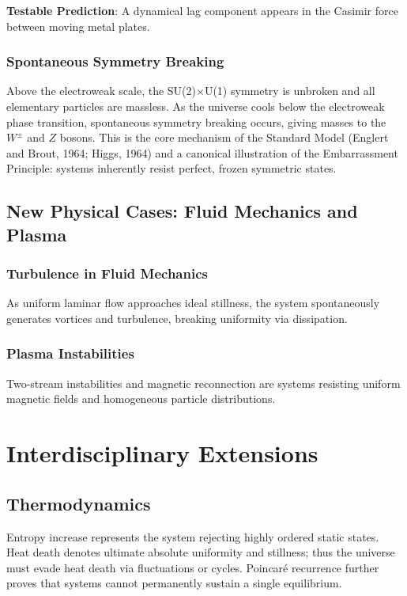 \documentclass[10pt,a4paper]{article}
\begin{document}
\textbf{Testable Prediction}: A dynamical lag component appears in the Casimir force between moving metal plates.

\subsubsection{Spontaneous Symmetry Breaking}
Above the electroweak scale, the SU(2)$\times$U(1) symmetry is unbroken and all elementary particles are massless. As the universe cools below the electroweak phase transition, spontaneous symmetry breaking occurs, giving masses to the $W^\pm$ and $Z$ bosons. This is the core mechanism of the Standard Model (Englert and Brout, 1964; Higgs, 1964) and a canonical illustration of the Embarrassment Principle: systems inherently resist perfect, frozen symmetric states.

\subsection{New Physical Cases: Fluid Mechanics and Plasma}
\subsubsection{Turbulence in Fluid Mechanics}
As uniform laminar flow approaches ideal stillness, the system spontaneously generates vortices and turbulence, breaking uniformity via dissipation.

\subsubsection{Plasma Instabilities}
Two-stream instabilities and magnetic reconnection are systems resisting uniform magnetic fields and homogeneous particle distributions.

\section{Interdisciplinary Extensions}

\subsection{Thermodynamics}
Entropy increase represents the system rejecting highly ordered static states. Heat death denotes ultimate absolute uniformity and stillness; thus the universe must evade heat death via fluctuations or cycles. Poincaré recurrence further proves that systems cannot permanently sustain a single equilibrium.
\end{document}
